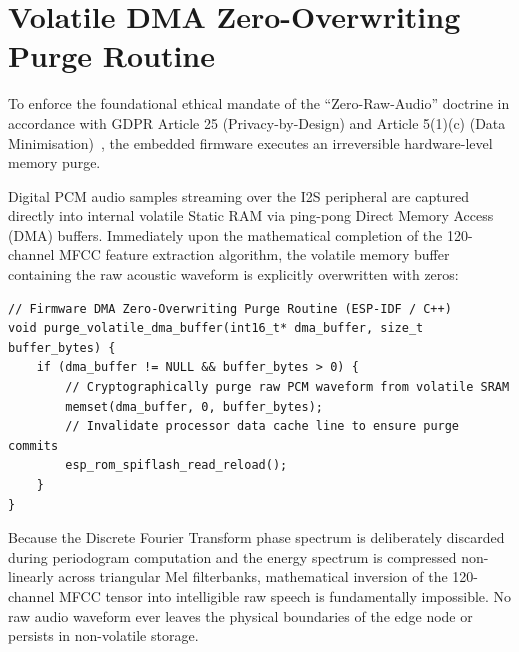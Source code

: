 \documentclass[12pt, a4paper]{report}
\begin{document}
\section{Volatile DMA Zero-Overwriting Purge Routine}
To enforce the foundational ethical mandate of the ``Zero-Raw-Audio'' doctrine in accordance with GDPR Article 25 (Privacy-by-Design) and Article 5(1)(c) (Data Minimisation)~\cite{ref_voigt2017}, the embedded firmware executes an irreversible hardware-level memory purge.

Digital PCM audio samples streaming over the I2S peripheral are captured directly into internal volatile Static RAM via ping-pong Direct Memory Access (DMA) buffers. Immediately upon the mathematical completion of the 120-channel MFCC feature extraction algorithm, the volatile memory buffer containing the raw acoustic waveform is explicitly overwritten with zeros:
\begin{verbatim}
// Firmware DMA Zero-Overwriting Purge Routine (ESP-IDF / C++)
void purge_volatile_dma_buffer(int16_t* dma_buffer, size_t buffer_bytes) {
    if (dma_buffer != NULL && buffer_bytes > 0) {
        // Cryptographically purge raw PCM waveform from volatile SRAM
        memset(dma_buffer, 0, buffer_bytes);
        // Invalidate processor data cache line to ensure purge commits
        esp_rom_spiflash_read_reload();
    }
}
\end{verbatim}
Because the Discrete Fourier Transform phase spectrum is deliberately discarded during periodogram computation and the energy spectrum is compressed non-linearly across triangular Mel filterbanks, mathematical inversion of the 120-channel MFCC tensor into intelligible raw speech is fundamentally impossible. No raw audio waveform ever leaves the physical boundaries of the edge node or persists in non-volatile storage.
\end{document}

